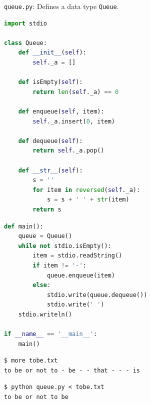 \documentclass[8pt,a4paper,compress,handout]{beamer}
\begin{document}
\begin{frame}[fragile]
\begin{framed}
\tiny \lstinline{queue.py}: Defines a data type \lstinline{Queue}.
\end{framed}

\begin{lstlisting}[language=Python]
import stdio

class Queue:
    def __init__(self):
        self._a = []

    def isEmpty(self):
        return len(self._a) == 0

    def enqueue(self, item):
        self._a.insert(0, item)

    def dequeue(self):
        return self._a.pop()

    def __str__(self):
        s = ''
        for item in reversed(self._a):
            s = s + ' ' + str(item)
        return s
\end{lstlisting}
\end{frame}

\begin{frame}[fragile]
\begin{lstlisting}[language=Python]
def main():
    queue = Queue()
    while not stdio.isEmpty():
        item = stdio.readString()
        if item != '-':
            queue.enqueue(item)
        else:
            stdio.write(queue.dequeue())
            stdio.write(' ')
    stdio.writeln()

if __name__ == '__main__':
    main()
\end{lstlisting}

\begin{lstlisting}[language={}]
$ more tobe.txt
to be or not to - be - - that - - - is
\end{lstlisting}

\begin{lstlisting}[language={}]
$ python queue.py < tobe.txt
to be or not to be
\end{lstlisting}
\end{frame}
\end{document}
